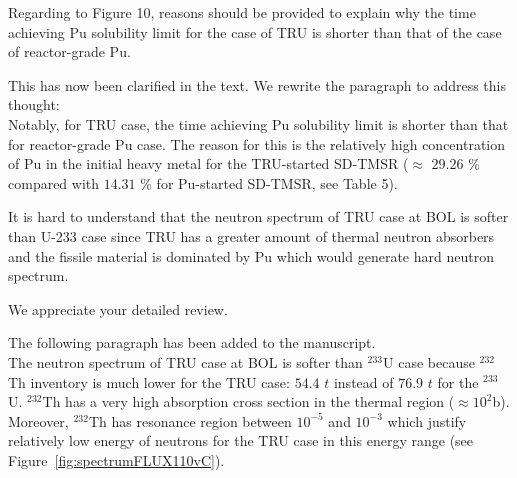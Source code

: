 \documentclass[answers,11pt]{exam}
\begin{document}
\begin{questions}
\begin{solution}
        \end{solution}

        \question Regarding to Figure 10, reasons should be provided to explain why the time achieving Pu solubility limit for the case of TRU is shorter than that of the case of reactor-grade Pu.
        \begin{solution}
                 This has now been clarified in the text.
                 We rewrite the paragraph to address this thought:\\
                 Notably, for TRU case, the time achieving Pu solubility limit is shorter than that for reactor-grade Pu case. The reason for this is the relatively high concentration of Pu in the initial heavy metal for the TRU-started SD-TMSR ($\approx$ $29.26$ \% compared with $14.31$ \% for Pu-started SD-TMSR, see Table 5).
                 
        \end{solution}

        \question It is hard to understand that the neutron spectrum of TRU case at BOL is softer than U-233 case since TRU has a greater amount of thermal neutron absorbers and the fissile material is dominated by Pu which would generate hard neutron spectrum.
        
        \begin{solution}
                 We appreciate your detailed review. 
                  
                 The following paragraph has been added to the manuscript.\\
                 The neutron spectrum of TRU case at BOL is softer than $^{233}$U case because $^{232}$Th inventory is much lower for the TRU case: $54.4$ $t$ instead of $76.9$ $t$ for the $^{233}$U. $^{232}$Th has a very high absorption cross section in the thermal region ($\approx10^2 $b). Moreover, $^{232}$Th has resonance region between $10^{-5}$ and $10^{-3}$ which justify relatively low energy of neutrons for the TRU case in this energy range (see Figure~\ref{fig:spectrumFLUX110vC}). 
                 
        \end{solution}


\end{questions}
\end{document}
